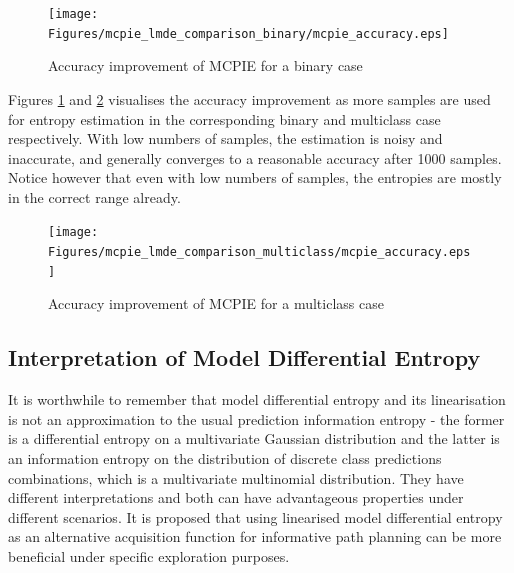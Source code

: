 			\begin{figure}[!htbp]
				\centering
					\texttt{[image: Figures/mcpie\_lmde\_comparison\_binary/mcpie\_accuracy.eps]}
				\caption{Accuracy improvement of MCPIE for a binary case}
				\label{Figure:mcpie_accuracy_binary}
			\end{figure}
				
			Figures \ref{Figure:mcpie_accuracy_binary} and \ref{Figure:mcpie_accuracy_multiclass} visualises the accuracy improvement as more samples are used for entropy estimation in the corresponding binary and multiclass case respectively. With low numbers of samples, the estimation is noisy and inaccurate, and generally converges to a reasonable accuracy after 1000 samples. Notice however that even with low numbers of samples, the entropies are mostly in the correct range already.
			
			\begin{figure}[!htbp]
				\centering
					\texttt{[image: Figures/mcpie\_lmde\_comparison\_multiclass/mcpie\_accuracy.eps]}
				\caption{Accuracy improvement of MCPIE for a multiclass case}
				\label{Figure:mcpie_accuracy_multiclass}
			\end{figure}
			
		\subsection{Interpretation of Model Differential Entropy}
		\label{InformativeSeafloorExploration:ComparisonMutualEntropyMeasures:InterpretationMDE}
		
			It is worthwhile to remember that model differential entropy and its linearisation is not an approximation to the usual prediction information entropy - the former is a differential entropy on a multivariate Gaussian distribution and the latter is an information entropy on the distribution of discrete class predictions combinations, which is a multivariate multinomial distribution. They have different interpretations and both can have advantageous properties under different scenarios. It is proposed that using linearised model differential entropy as an alternative acquisition function for informative path planning can be more beneficial under specific exploration purposes.
			
